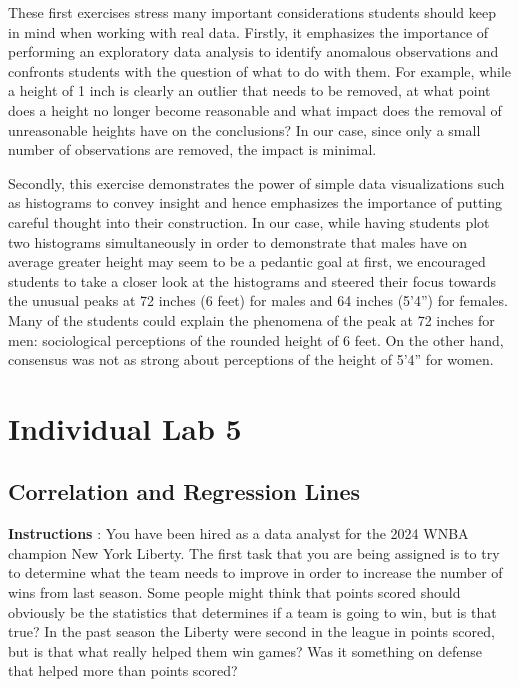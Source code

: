 \documentclass[
  letterpaper,
  DIV=11,
  numbers=noendperiod]{scrreprt}
\begin{document}
These first exercises stress many important considerations students
should keep in mind when working with real data. Firstly, it emphasizes
the importance of performing an exploratory data analysis to identify
anomalous observations and confronts students with the question of what
to do with them. For example, while a height of 1 inch is clearly an
outlier that needs to be removed, at what point does a height no longer
become reasonable and what impact does the removal of unreasonable
heights have on the conclusions? In our case, since only a small number
of observations are removed, the impact is minimal.

Secondly, this exercise demonstrates the power of simple data
visualizations such as histograms to convey insight and hence emphasizes
the importance of putting careful thought into their construction. In
our case, while having students plot two histograms simultaneously in
order to demonstrate that males have on average greater height may seem
to be a pedantic goal at first, we encouraged students to take a closer
look at the histograms and steered their focus towards the unusual peaks
at 72 inches (6 feet) for males and 64 inches (5'4'') for females. Many
of the students could explain the phenomena of the peak at 72 inches for
men: sociological perceptions of the rounded height of 6 feet. On the
other hand, consensus was not as strong about perceptions of the height
of 5'4'' for women.

\chapter*{Individual Lab 5}\label{individual-lab-5}


\section*{Correlation and Regression
Lines}\label{correlation-and-regression-lines}


\textbf{Instructions} : You have been hired as a data analyst for the
2024 WNBA champion New York Liberty. The first task that you are being
assigned is to try to determine what the team needs to improve in order
to increase the number of wins from last season. Some people might think
that points scored should obviously be the statistics that determines if
a team is going to win, but is that true? In the past season the Liberty
were second in the league in points scored, but is that what really
helped them win games? Was it something on defense that helped more than
points scored?
\end{document}
